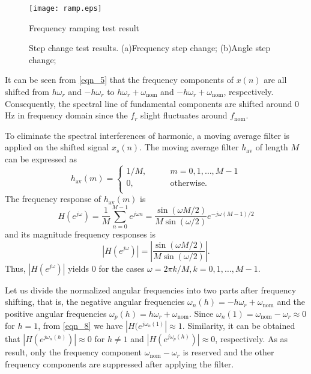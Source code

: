 \documentclass[journal,twoside]{IEEEtran}
\begin{document}
\begin{figure}[t]
	\centering
	\texttt{[image: ramp.eps]}
	\caption{Frequency ramping test result}
	\label{fig_5}									
\end{figure}

\begin{figure}
	\centering
	
 \caption{Step change test results.
		(a)Frequency step change; (b)Angle  step change;}	\label{fig_6}
\end{figure}


It can be seen from  \eqref{eqn_5} that the frequency components of $x(n)$ are all shifted  from $h\omega_r$ and $-h\omega_r$ to $h\omega_r+\omega_\mathrm{nom}$ and $-h\omega_r+\omega_\mathrm{nom}$, respectively. Consequently, the spectral line of fundamental components are shifted around 0 Hz in frequency domain since the $f_r$ slight fluctuates around $f_\mathrm{nom}$.

To eliminate the spectral interferences of harmonic, a moving average filter is applied on the shifted signal $x_s(n)$. The  moving average filter $h_\mathrm{av}$ of length $M$ can be expressed as 
\begin{equation}
h_\mathrm{av}(m)=\begin{cases}
1/M,\qquad &m=0,1,\ldots,M-1\\
0, &\text{otherwise.}\\
\end{cases}\label{eqn_6}
\end{equation}
The frequency response of $h_\mathrm{av}(m)$ is
\begin{equation}
H(e^{j\omega})=\dfrac{1}{M}\sum_{n=0}^{M-1}e^{j\omega n}=\dfrac{\sin(\omega M/2)}{M\sin(\omega/2)}e^{-j\omega (M-1)/2}\label{eqn_7}
\end{equation}
and its magnitude frequency responses is
\begin{equation}
|H(e^{j\omega })|=\left|\dfrac{\sin(\omega M/2)}{M\sin(\omega/2)}\right|\mathrm{.}\label{eqn_8}
\end{equation}
Thus, $|H(e^{j\omega })|$ yields $0$ for the cases $\omega=2\pi k/M,k=0,1,\ldots,M-1$.

Let us divide the normalized angular frequencies into two parts after frequency shifting, that is, the negative angular frequencies $\omega_n(h)=-h\omega_r+\omega_\mathrm{nom}$ and the positive angular frequencies $\omega_p(h)=h\omega_r+\omega_\mathrm{nom}$. Since $\omega_n(1)=\omega_\mathrm{nom}-\omega_r\approx0$ for $h=1$, from \eqref{eqn_8} we have $|H(e^{j\omega_n(1)}|\approx1$. Similarity, it can be obtained that $|H(e^{j\omega_n(h)})|\approx0$ for $h\neq1$ and $|H(e^{j\omega_p(h)})|\approx0$, respectively. As as result, only the frequency component $\omega_\mathrm{nom}-\omega_r$ is reserved and the other frequency components are suppressed after applying the  filter.
\end{document}

